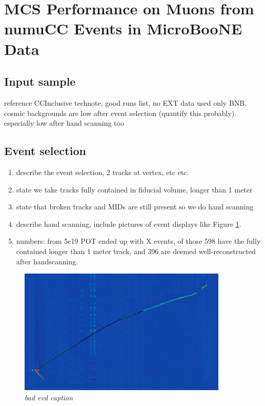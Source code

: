 \section{MCS Performance on Muons from numuCC Events in MicroBooNE Data}\label{data_performance_section}

\subsection{Input sample}
reference CCInclusive technote, good runs list, no EXT data used only BNB. cosmic backgrounds are low after event selection (quantify this probably). especially low after hand scanning too

\subsection{Event selection}
\begin{enumerate}
\item describe the event selection, 2 tracks at vertex, etc etc.
\item state we take tracks fully contained in fiducial volume, longer than 1 meter
\item state that broken tracks and MIDs are still present so we do hand scanning
\item describe hand scanning, include pictures of event displays like Figure \ref{bad_evd_fig_1}.
\item numbers: from 5e19 POT ended up with X events, of those 598 have the fully contained longer than 1 meter track, and 396 are deemed well-reconstructed after handscanning.
\end{enumerate}


\begin{figure}[h!]
\begin{center}
\includegraphics[width=100mm]{Figures/bad_evd_1.png}
\end{center}
\caption{\textit{bad evd caption}}
\label{bad_evd_fig_1}
\end{figure}

